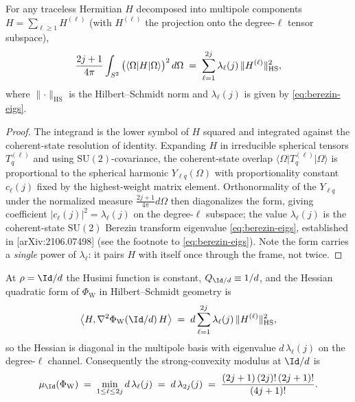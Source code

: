 \begin{lemma}
\label{lem:berezin-form}
For any traceless Hermitian $H$ decomposed into multipole components
$H=\sum_{\ell\ge1}H^{(\ell)}$ (with $H^{(\ell)}$ the projection onto the
degree-$\ell$ tensor subspace),
\begin{equation}
  \frac{2j+1}{4\pi}\int_{S^{2}}\big(\langle\Omega\rvert H\lvert\Omega\rangle\big)^2\,d\Omega
  \;=\;\sum_{\ell=1}^{2j}\lambda_\ell(j)\,\lVert H^{(\ell)}\rVert_{\mathrm{HS}}^2 ,
  \label{eq:berezin-form}
\end{equation}
where $\lVert\cdot\rVert_{\mathrm{HS}}$ is the Hilbert--Schmidt norm and
$\lambda_\ell(j)$ is given by \eqref{eq:berezin-eigs}.
\end{lemma}

\begin{proof}
The integrand is the lower symbol of $H$ squared and integrated against the
coherent-state resolution of identity. Expanding $H$ in irreducible spherical
tensors $T^{(\ell)}_q$ and using $\mathrm{SU}(2)$-covariance, the
coherent-state overlap $\langle\Omega\rvert T^{(\ell)}_q\lvert\Omega\rangle$ is
proportional to the spherical harmonic $Y_{\ell q}(\Omega)$ with proportionality
constant $c_\ell(j)$ fixed by the highest-weight matrix element. Orthonormality
of the $Y_{\ell q}$ under the normalized measure $\frac{2j+1}{4\pi}d\Omega$
then diagonalizes the form, giving coefficient $|c_\ell(j)|^2=\lambda_\ell(j)$
on the degree-$\ell$ subspace; the value $\lambda_\ell(j)$ is the
coherent-state $\mathrm{SU}(2)$ Berezin transform eigenvalue
\eqref{eq:berezin-eigs}, established in [arXiv:2106.07498] (see the footnote to
\eqref{eq:berezin-eigs}). Note the
form carries a \emph{single} power of $\lambda_\ell$: it pairs $H$ with itself
once through the frame, not twice.
\end{proof}

\begin{lemma}
\label{lem:hess-Id}
At $\rho=\Id/d$ the Husimi function is constant, $Q_{\Id/d}\equiv 1/d$, and the
Hessian quadratic form of $\Phi_{\mathrm W}$ in Hilbert--Schmidt geometry is
\begin{equation}
  \big\langle H,\Hess\Phi_{\mathrm W}(\Id/d)\,H\big\rangle
  \;=\; d\sum_{\ell=1}^{2j}\lambda_\ell(j)\,\lVert H^{(\ell)}\rVert_{\mathrm{HS}}^2 ,
  \label{eq:hess-channels}
\end{equation}
so the Hessian is diagonal in the multipole basis with eigenvalue
$d\,\lambda_\ell(j)$ on the degree-$\ell$ channel. Consequently the
strong-convexity modulus at $\Id/d$ is
\begin{equation}
  \mu_{\Id}(\Phi_{\mathrm W})
  \;=\;\min_{1\le \ell\le 2j} d\,\lambda_\ell(j)
  \;=\;d\,\lambda_{2j}(j)
  \;=\;\frac{(2j+1)\,(2j)!\,(2j+1)!}{(4j+1)!}.
  \label{eq:modulus-Id}
\end{equation}
\end{lemma}

